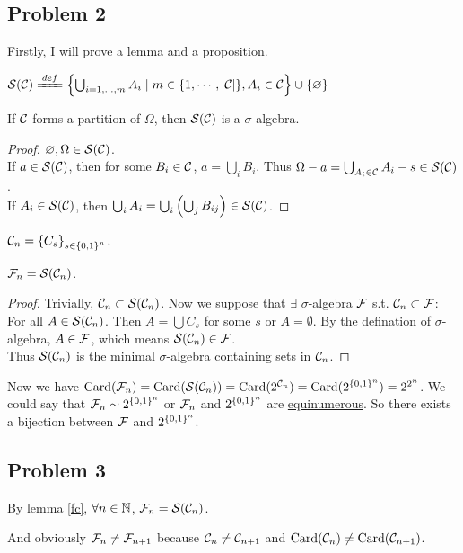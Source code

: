\documentclass{article}
\begin{document}
\subsection*{\centering Problem 2}
Firstly, I will prove a lemma and a proposition.
\begin{defi}
	$\+S(\+C)\deq\set{\bigcup_{i=1, \ldots,m} A_i\mid m\in\set{1, \cdots,\abs{\+C}},A_i\in \+C}\cup\set{\emptyset}$
\end{defi}
\begin{lemma}
	\label{fc}
	If $\mathcal{C}$ forms a partition of $\Omega$, then $\mathcal{S}(\mathcal{C})$ is a  $\sigma$-algebra.
\end{lemma}
\begin{proof}
	$\varnothing,\Omega\in\mathcal{S}(\mathcal{C})$.
	\\
	If $a\in\mathcal{S}(\mathcal{C})$, then for some $B_i\in\mathcal{C}$, $a=\bigcup_i B_i$. 
	Thus $\Omega-a=\bigcup_{A_i\in\mathcal{C}} A_i-s\in\mathcal{S}(\mathcal{C})$.
	\\
	If $A_i\in \mathcal{S}(\mathcal{C})$, then $\bigcup_iA_i=\bigcup_i\qty(\bigcup_j B_{ij})\in\mathcal{S}(\mathcal{C})$.
\end{proof}
\begin{defi}
	 $\mathcal{C}_n={\qty{C_s}_{s\in\qty{0,1}^n}}$. 
\end{defi}
\begin{prp}
	$\mathcal{F}_n=\mathcal{S}({\mathcal{C}_n})$.
\end{prp}
\begin{proof}
	Trivially, $\mathcal{C}_n\subset\mathcal{S}(\mathcal{C}_n)$. Now we suppose that $\exists$ $\sigma$-algebra  $\mathcal{F}$ s.t. $\mathcal{C}_n\subset\mathcal{F}$:
\\
For all $A\in\mathcal{S}(\mathcal{C}_n)$. Then $A=\bigcup C_s$ for some $s$ or $A=\emptyset$. By the defination of $\sigma$-algebra, $A\in\mathcal{F}$, which means  $\mathcal{S}(\mathcal{C}_n)\in\mathcal{F}$.
\\
Thus $\mathcal{S}(\mathcal{C}_n)$ is the minimal  $\sigma$-algebra containing sets in $\mathcal{C}_n$.
\end{proof}
Now we have $\text{Card}(\mathcal{F}_n)=\mbox{Card}(\mathcal{S}(\mathcal{C}_n))=\text{Card}(2^{\mathcal{C}_n})=\text{Card}(2^{\qty{0,1}^n})=2^{2^n}$. We could say that $\mathcal{F}_n\sim 2^{\qty{0,1}^n}$ or $\mathcal{F}_n$ and $2^{\qty{0,1}^n}$ are \href{https://mathworld.wolfram.com/Equinumerous.html}{equinumerous}. So there exists a bijection between $\mathcal{F}$ and  $2^{\qty{0,1}^n}$.

\subsection*{\centering Problem 3}
By lemma \ref{fc}, $\forall n\in\mathbb{N}$, $\mathcal{F}_n=\mathcal{S}(\mathcal{C}_n)$.

And obviously $\mathcal{F}_n\ne \mathcal{F}_{n+1}$ because $\mathcal{C}_n\ne \mathcal{C}_{n+1}$ and $\text{Card}(\mathcal{C}_n)\ne \text{Card}(\mathcal{C}_{n+1})$.
\end{document}
